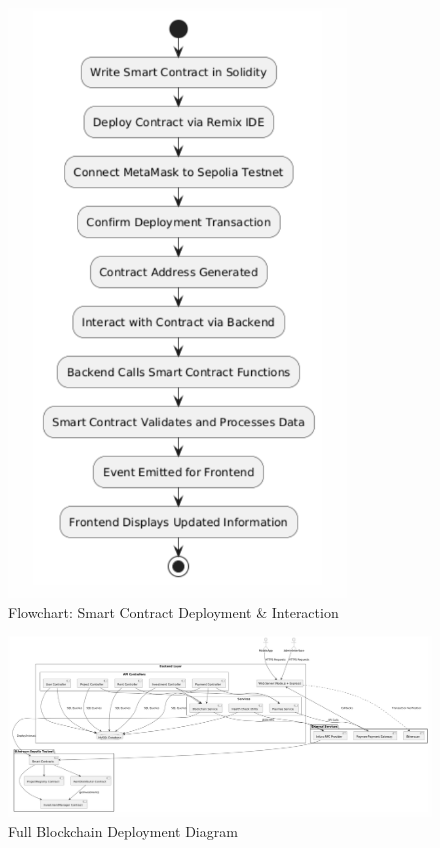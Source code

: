 \newpage
\begin{figure}[htbp]
  \centering
  \includegraphics[width=0.8\textwidth]{images/contract_flowchart.png}
  \caption{Flowchart: Smart Contract Deployment \& Interaction}
  \label{fig:contract-flowchart}
\end{figure}

\newpage
\begin{figure}[htbp]
  \centering
  \includegraphics[width=\textwidth]{images/blockchain_deployment_diagram.png}
  \caption{Full Blockchain Deployment Diagram}
  \label{fig:blockchain-deployment}
\end{figure}

